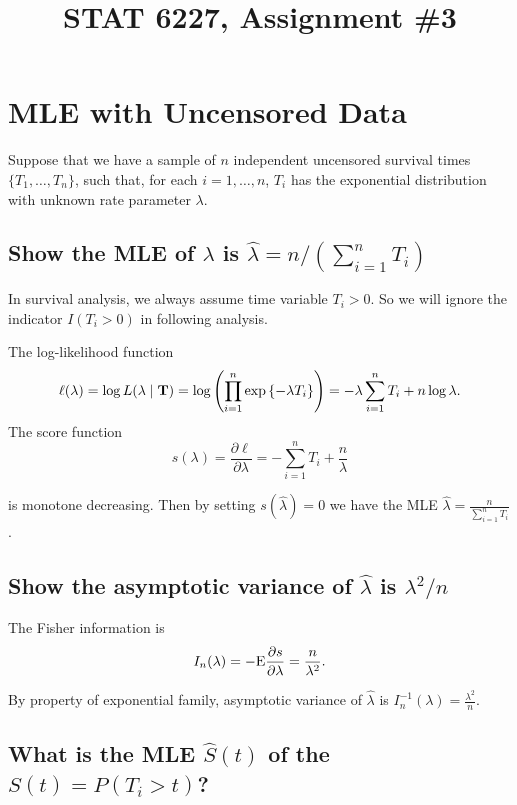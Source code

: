 \documentclass[11pt]{article}
\newcommand{\E}{\mbox{{\rm E}}}
\newcommand{\hS}{\hat{S}}
\newcommand{\hlam}{\hat{\lambda}}
\newcommand{\bT}{{\bf{T}}}
\begin{document}
\title{STAT 6227, Assignment \#3}
\maketitle

\section{MLE with Uncensored Data}

Suppose that we have a sample of $n$ independent uncensored survival times
$\{T_1,\dots,T_n\}$, such that, for each $i = 1,\dots,n$, $T_i$ has the
exponential distribution with unknown rate parameter $\lambda$.
\subsection{Show the MLE of $\lambda$ is $\hlam = n/(\sum_{i=1}^{n}T_{i})$}
In survival analysis, we always assume time variable $T_i>0$. So we will ignore the indicator
$I(T_i>0)$ in following analysis.

The log-likelihood function
\begin{equation*}
  \ell (\lambda) = \log L(\lambda\mid\bT)= \log \left(\prod_{i=1}^n \exp \left\{ -\lambda T_i \right\}\right)=-\lambda\sum_{i=1}^n T_i + n\log\lambda.
\end{equation*}
The score function
\begin{equation*}
s(\lambda) = \frac{\partial \ell}{\partial \lambda} = -\sum_{i=1}^n T_i + \frac{n}{\lambda}
\end{equation*}

is monotone decreasing. Then by setting $s(\hlam)=0$ we have the MLE $\hlam = \frac{n}{\sum_{i=1}^n T_i}$.

\subsection{Show the asymptotic variance of $\hlam$ is $\lambda^{2}/n$}

The Fisher information is
\begin{equation*}
I_n(\lambda) = -\E \frac{\partial s}{\partial \lambda} = \frac{n}{\lambda^2}.
\end{equation*}

By property of exponential family, asymptotic variance of $\hlam$ is
$I_n^{-1}(\lambda) = \frac{\lambda^2}{n}$.

\subsection{What is the MLE $\hS(t)$ of the $S(t) = P(T_{i}>t)$?}
\end{document}
